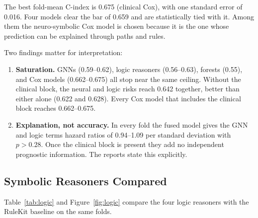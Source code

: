 \documentclass{mnnit}
\begin{document}
The best fold-mean C-index is 0.675 (clinical Cox), with one standard error of 0.016. Four models clear the bar of
0.659 and are statistically tied with it. Among them the neuro-symbolic Cox model is chosen because it is the one
whose prediction can be explained through paths and rules.

Two findings matter for interpretation:
\begin{enumerate}
  \item \textbf{Saturation.} GNNs (0.59--0.62), logic reasoners (0.56--0.63), forests (0.55), and Cox models
        (0.662--0.675) all stop near the same ceiling. Without the clinical block, the neural and logic risks reach
        0.642 together, better than either alone (0.622 and 0.628). Every Cox model that includes the clinical block
        reaches 0.662--0.675.
  \item \textbf{Explanation, not accuracy.} In every fold the fused model gives the GNN and logic terms hazard
        ratios of 0.94--1.09 per standard deviation with $p > 0.28$. Once the clinical block is present they add no
        independent prognostic information. The reports state this explicitly.
\end{enumerate}

\subsection{Symbolic Reasoners Compared}
Table~\ref{tab:logic} and Figure~\ref{fig:logic} compare the four logic reasoners with the RuleKit baseline on the
same folds.

\begin{table}[htbp]
  \centering
  \small\setlength{\tabcolsep}{4pt}
  \caption{Symbolic reasoners on the full follow-up: five-fold Harrell's C (mean $\pm$ sd), Uno's C, learned formulas
  per fold, and the share of formulas that reason over a PrimeKG relation.}
  \label{tab:logic}
\end{table}
\end{document}
